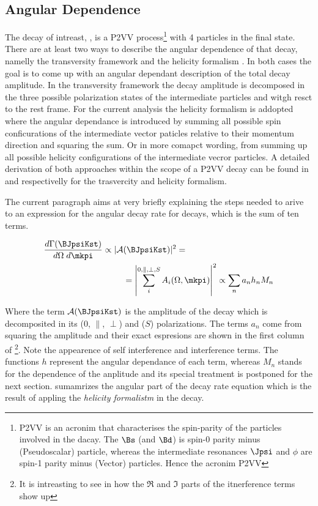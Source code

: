\subsection{Angular Dependence}
\label{Diferential_Decay_Rate}
The decay of intreast, \BJpsiKst, is a P2VV process\footnote{P2VV is an acronim that characterises the spin-parity of the particles involved in the dacay.
The $\Bs$ (and $\Bd$) is spin-0 parity minus (Pseudoscalar) particle, whereas the intermediate resonances $\Jpsi$ and $\phi$ are spin-1 parity minus (Vector) particles. Hence the
acronim P2VV} with 4 particles in the final state. There are at least two ways to describe the angular dependence of that decay, namelly the transversity framework \cite{transvFrameworkI,transvFrameworkII}
and the helicity formalism \cite{helicityFormI,helicityFormII}. In both cases the goal is to come up with an angular dependant description of the total decay amplitude.
In the transversity framework the decay amplitude is decomposed in the three possible polarization states of the intermediate particles \Jpsi and \Kst witgh resct to the \Bs rest frame. For the current analysis the helicity
formalism is addopted where the angular dependance is introduced by summing all possible spin conficurations of the intermediate vector paticles relative to their 
momentum direction and squaring the sum. Or in more comapct wording, from summing up all possible helicity configurations of the intermediate vecror particles. A detailed derivation of both 
approaches within the scope of a P2VV decay can be found in \cite{daanThesis} and \cite{jeroenThesis} respectivelly for the trasvercity and helicity formalism.
 
The current paragraph aims at very briefly explaining the steps needed to arive to an expression for the angular decay rate for \BsJpsiKst decays, which is the sum of ten terms.  

\begin{align}
  \frac{d\Gamma(\text{\BJpsiKst})}{d\Omega\;d\mkpi} \propto |\mathcal{A}&(\text{\BJpsiKst})|^2 = \nonumber \\
                                                    &= \left| \sum_i^{0,\parallel,\perp,S} A_i(\Omega,\mkpi) \right|^2  \propto \sum_n a_n h_n M_n
  \label{ang_terms}
\end{align}

\noindent Where the term $\mathcal{A}(\text{\BJpsiKst})$ is the amplitude of the decay which is decomposited in its \pwave ($0$, $\parallel$, $\perp$) and \swave ($S$) polarizations.
The terms $a_n$ come from squaring the amplitude and their exact espresions are shown in the first column of 
\footnote{It is intreasting to see in \cite{jeroen_thesis} how the $\Re$ and $\Im$ parts of the itnerference terms show up}. 
Note the appearence of \pwave self interference and \spwave interference terms. The functions $h$ represent the angular dependance of each term, whereas $M_n$ stands 
for the \mkpi dependence of the anplitude and its special treatment is postponed for the next section.  sumamrizes the angular part of the decay rate
equation which is the result of appling the \emph{helicity formalistm} in the \BJpsiKst decay.

